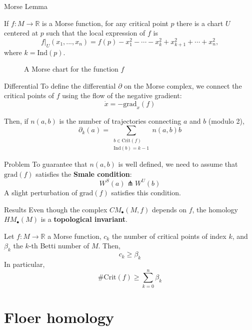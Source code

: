 \documentclass{beamer}
\newcommand{\con}[1]{\mathbb{#1}}
\newcommand{\R}{\con{R}}
\begin{document}
\begin{frame}{Morse Lemma}
	\begin{theorem}
		If $f : M \rightarrow \R$ is a Morse function, for any critical point $p$ there is a chart $U$ centered at $p$ such that the local expression of $f$ is
		\[\left. f\right|_U(x_1,...,x_n) = f(p) - x_1^2 - \cdots - x_k^2 + x_{k+1}^2 + \cdots + x_n^2,\]
		where $k = \mathrm{Ind}(p)$.
	\end{theorem}

	\begin{figure}
		
		\label{figure:morse_chart}
		\caption{A Morse chart for the function $f$}
	\end{figure}
\end{frame}

\begin{frame}{Differential}
	To define the differential $\partial$ on the Morse complex, we connect the critical points of $f$ using the flow of the negative gradient:
	\[\dot{x} = - \mathrm{grad}_x (f)\]

	Then, if $n(a,b)$ is the number of trajectories connecting $a$ and $b$ (modulo 2),
	\[\partial_k(a) = \sum_{\substack{b \in \mathrm{Crit}(f) \\ \mathrm{Ind}(b) = k-1}} n(a,b) b\]

	\begin{block}{Problem}
		To guarantee that $n(a,b)$ is well defined, we need to assume that $\mathrm{grad}(f)$ satisfies the {\bf Smale condition}:
		\[W^S(a) \pitchfork W^U(b)\]
		A slight perturbation of $\mathrm{grad}(f)$ satisfies this condition.
	\end{block}
\end{frame}

\begin{frame}{Results}
	Even though the complex $CM_{\bullet}(M,f)$ depends on $f$, the homology $HM_{\bullet}(M)$ is a {\bf topological invariant}.

	\begin{theorem}
		Let $f : M \rightarrow \R$ a Morse function, $c_k$ the number of critical points of index $k$, and $\beta_k$ the $k$-th Betti number of $M$. Then,
		\[c_k \geq \beta_k\]
		In particular,
		\[\# \mathrm{Crit}(f) \geq \sum_{k=0}^n \beta_k\]
	\end{theorem}
\end{frame}

\section{Floer homology}
\end{document}
